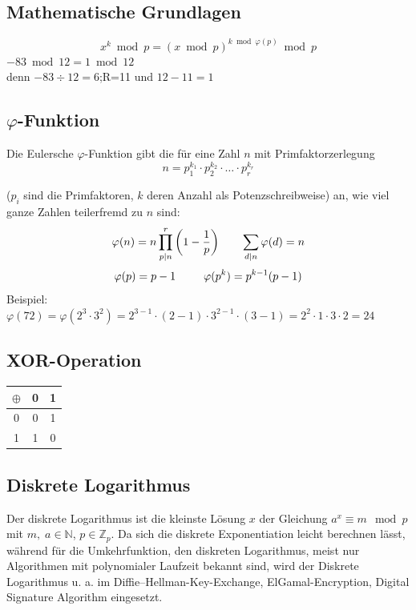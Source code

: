 \documentclass[8pt,a4paper,landscape]{article}
\begin{document}
\begin{multicols}{4}
\section{Mathematische Grundlagen}

\[ x^k \bmod p = \left( x \bmod p \right)^{k \bmod \varphi(p)} \bmod p \]
$-83 \bmod 12 = 1 \bmod 12$ \\denn $-83 \div 12 = 6$;R=11 und $12-11=1$
\subsection{$\varphi$-Funktion}
Die Eulersche $\varphi$-Funktion gibt die für eine Zahl $n$ mit Primfaktorzerlegung 
\[n = p_{1}^{k_1} \cdot p_{2}^{k_2} \cdot \ldots \cdot p_{r}^{k_r}\]

($p_{i}$ sind die Primfaktoren, $k$ deren Anzahl als Potenzschreibweise) an, wie viel ganze Zahlen teilerfremd zu \(n\) sind:
\[\varphi(n) = n\prod_{p|n}^{r}\left (1 - \frac{1}{p}\right)\thickspace\thickspace\thickspace\thickspace\thickspace\thickspace\thickspace\sum_{d \vert n} \varphi(d) = n  \]
\[\varphi(p) = p - 1\thickspace\thickspace\thickspace\thickspace\thickspace\thickspace\thickspace\thickspace\thickspace\varphi(p^k) = p^{k-1}(p-1) \]
Beispiel: 
$\varphi(72) = \varphi(2^3\cdot3^2)=2^{3-1}\cdot(2-1)\cdot3^{2-1}\cdot(3-1)=2^2\cdot1\cdot3\cdot2=24$

\subsection{XOR-Operation}
\begin{center}
\begin{tabular}{c| c c }
$\oplus$ & 0 & 1 \\ \hline
0 & 0 & 1\\ 
1 & 1 & 0 
\end{tabular}
\end{center}

\subsection{Diskrete Logarithmus}
Der diskrete Logarithmus ist die kleinste Lösung $x$ der Gleichung $a^x \equiv m \mod p$ mit $m, \;a \in \mathbb{N}$, $p \in \mathbb{Z}_p$. Da sich die diskrete Exponentiation leicht berechnen lässt, während für die Umkehrfunktion, den diskreten Logarithmus, meist nur Algorithmen mit polynomialer Laufzeit bekannt sind, wird der Diskrete Logarithmus u. a. im Diffie–Hellman-Key-Exchange, ElGamal-Encryption, Digital Signature Algorithm eingesetzt.


\end{multicols}
\end{document}
